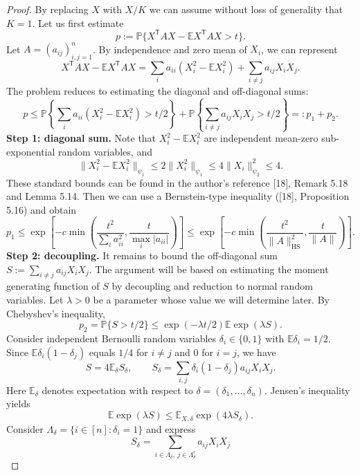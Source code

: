 \begin{proof}
By replacing $X$ with $X/K$ we can assume without loss of generality that
$K=1$. Let us first estimate
\[
p:=\mathbb P\{X^{\mathsf T}AX-\mathbb E X^{\mathsf T}AX>t\}.
\]
Let $A=(a_{ij})_{i,j=1}^n$. By independence and zero mean of $X_i$, we can represent
\[
X^{\mathsf T}AX-\mathbb E X^{\mathsf T}AX
=\sum_i a_{ii}(X_i^2-\mathbb E X_i^2)+\sum_{i\ne j}a_{ij}X_iX_j.
\]
The problem reduces to estimating the diagonal and off-diagonal sums:
\[
p\leq\mathbb P\!\left\{\sum_i a_{ii}(X_i^2-\mathbb E X_i^2)>t/2\right\}
+\mathbb P\!\left\{\sum_{i\ne j}a_{ij}X_iX_j>t/2\right\}=:p_1+p_2.
\]
\textbf{Step 1: diagonal sum.}
Note that $X_i^2-\mathbb E X_i^2$ are independent mean-zero sub-exponential
random variables, and
\[
\|X_i^2-\mathbb E X_i^2\|_{\psi_1}
\leq2\|X_i^2\|_{\psi_1}\leq4\|X_i\|_{\psi_2}^2\leq4.
\]
These standard bounds can be found in the author's reference [18],
Remark 5.18 and Lemma 5.14. Then we can use a Bernstein-type inequality
([18], Proposition 5.16) and obtain
\begin{equation}\label{hw-diag}
p_1\leq\exp\!\left[-c\min\left(\frac{t^2}{\sum_i a_{ii}^2},
\frac{t}{\max_i|a_{ii}|}\right)\right]
\leq\exp\!\left[-c\min\left(\frac{t^2}{\|A\|_{\mathrm{HS}}^2},
\frac{t}{\|A\|}\right)\right].
\end{equation}
\textbf{Step 2: decoupling.}
It remains to bound the off-diagonal sum $S:=\sum_{i\ne j}a_{ij}X_iX_j$.
The argument will be based on estimating the moment generating function of $S$
by decoupling and reduction to normal random variables.
Let $\lambda>0$ be a parameter whose value we will determine later. By
Chebyshev's inequality,
\begin{equation}\label{hw-markov}
p_2=\mathbb P\{S>t/2\}\leq\exp(-\lambda t/2)\mathbb E\exp(\lambda S).
\end{equation}
Consider independent Bernoulli random variables $\delta_i\in\{0,1\}$ with
$\mathbb E\delta_i=1/2$. Since $\mathbb E\delta_i(1-\delta_j)$ equals $1/4$
for $i\ne j$ and $0$ for $i=j$, we have
\[
S=4\mathbb E_\delta S_\delta,\qquad
S_\delta=\sum_{i,j}\delta_i(1-\delta_j)a_{ij}X_iX_j.
\]
Here $\mathbb E_\delta$ denotes expectation with respect to
$\delta=(\delta_1,\ldots,\delta_n)$. Jensen's inequality yields
\begin{equation}\label{hw-jensen}
\mathbb E\exp(\lambda S)\leq\mathbb E_{X,\delta}\exp(4\lambda S_\delta).
\end{equation}
Consider $\Lambda_\delta=\{i\in[n]:\delta_i=1\}$ and express
\[
S_\delta=\sum_{i\in\Lambda_\delta,\ j\in\Lambda_\delta^c}a_{ij}X_iX_j
\]
\end{proof}
